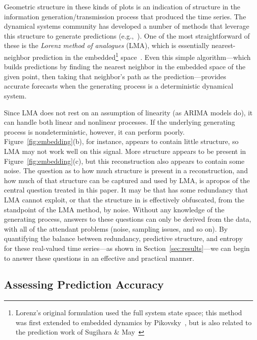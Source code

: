 Geometric structure in these kinds of plots is an indication of
structure in the information generation/transmission process that
produced the time series.  The dynamical systems community has
developed a number of methods that leverage this structure to generate
predictions (e.g.,~\cite{weigend-book,casdagli-eubank92,Smith199250}).
One of the most straightforward of these is the \emph{Lorenz method of
  analogues} (LMA), which is essentially nearest-neighbor prediction
in the embedded\footnote{Lorenz's original formulation used the full
  system state space;
%
%
this method was first extended to embedded dynamics by
Pikovsky~\cite{pikovsky86-sov}, but is also related to the prediction
work of Sugihara \& May~\cite{sugihara90}}
space~\cite{lorenz-analogues}.  Even this simple algorithm---which
builds predictions by finding the nearest neighbor in the embedded
space of the given point, then taking that neighbor's path as the
prediction---provides accurate forecasts when the generating process
is a deterministic dynamical system.

Since LMA does not rest on an assumption of linearity (as ARIMA models
do), it can handle both linear and nonlinear processes.  If the
underlying generating process is nondeterministic, however, it can
perform poorly.  Figure~\ref{fig:embedding}(b), for instance, appears
to contain little structure, so LMA may not work well on this signal.
More structure appears to be present in Figure~\ref{fig:embedding}(c),
but this reconstruction also appears to contain some noise.  The
question as to how much structure is present in a reconstruction, and
how much of that structure can be captured and used by LMA, is apropos
of the central question treated in this paper.  It may be that \gcc
has some redundancy that LMA cannot exploit, or that the structure in
\svdfive is effectively obfuscated, from the standpoint of the LMA
method, by noise.  Without any knowledge of the generating process,
answers to these questions can only be derived from the data, with all
of the attendant problems (noise, sampling issues, and so on).  By
quantifying the balance between redundancy, predictive structure, and
entropy for these real-valued time series---as shown in
Section~\ref{sec:results}---we can begin to answer these questions in
an effective and practical manner.


\subsection{Assessing Prediction Accuracy}
\label{sec:accuracy}

